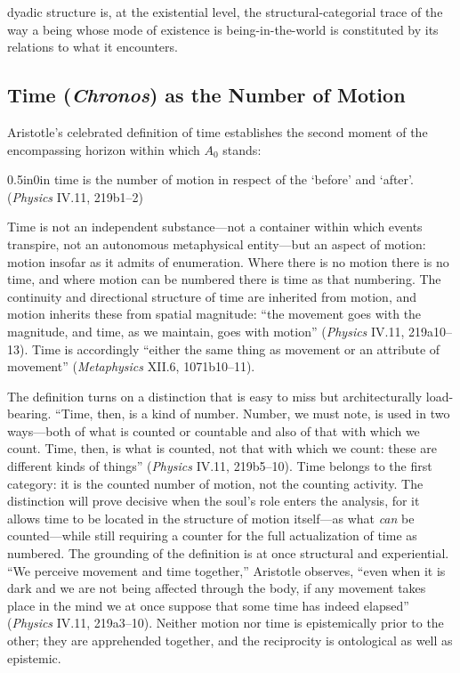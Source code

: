 dyadic structure is, at the existential level, the structural-categorial trace of the way a being whose mode of existence is being-in-the-world is constituted by its relations to what it encounters.

\subsection{Time (\textit{Chronos}) as the Number of Motion}

Aristotle's celebrated definition of time establishes the second moment of the encompassing horizon within which $A_0$ stands:
\begin{adjustwidth}{0.5in}{0in}
time is the number of motion in respect of the `before' and `after'. (\textit{Physics} IV.11, 219b1--2)
\end{adjustwidth}
Time is not an independent substance---not a container within which events transpire, not an autonomous metaphysical entity---but an aspect of motion: motion insofar as it admits of enumeration. Where there is no motion there is no time, and where motion can be numbered there is time as that numbering. The continuity and directional structure of time are inherited from motion, and motion inherits these from spatial magnitude: ``the movement goes with the magnitude, and time, as we maintain, goes with motion'' (\textit{Physics} IV.11, 219a10--13). Time is accordingly ``either the same thing as movement or an attribute of movement'' (\textit{Metaphysics} XII.6, 1071b10--11).

The definition turns on a distinction that is easy to miss but architecturally load-bearing. ``Time, then, is a kind of number. Number, we must note, is used in two ways---both of what is counted or countable and also of that with which we count. Time, then, is what is counted, not that with which we count: these are different kinds of things'' (\textit{Physics} IV.11, 219b5--10). Time belongs to the first category: it is the counted number of motion, not the counting activity. The distinction will prove decisive when the soul's role enters the analysis, for it allows time to be located in the structure of motion itself---as what \textit{can} be counted---while still requiring a counter for the full actualization of time as numbered. The grounding of the definition is at once structural and experiential. ``We perceive movement and time together,'' Aristotle observes, ``even when it is dark and we are not being affected through the body, if any movement takes place in the mind we at once suppose that some time has indeed elapsed'' (\textit{Physics} IV.11, 219a3--10). Neither motion nor time is epistemically prior to the other; they are apprehended together, and the reciprocity is ontological as well as epistemic.

